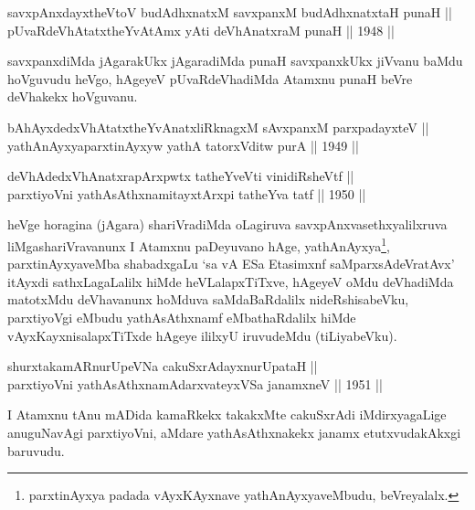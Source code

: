 \begin{shl}
savxpAnxdayxtheVtoV budAdhxnatxM savxpanxM budAdhxnatxtaH punaH || \\
pUvaRdeVhAtatxtheYvA\s \s tAmx yAti deVhAnatxraM punaH ||  1948 ||  
\end{shl}

\begin{artha}
savxpanxdiMda jAgarakUkx jAgaradiMda punaH savxpanxkUkx jiVvanu baMdu
hoVguvudu heVgo, hAgeyeV pUvaRdeVhadiMda Atamxnu punaH beVre deVhakekx
hoVguvanu.
\end{artha}


\begin{shl}
bAhAyxdedxVhAtatxtheYvAnatxliRknagxM sAvxpanxM parxpadayxteV || \\
yathAnAyxyaparxtinAyxyw yathA tatorxVditw purA ||  1949 ||  
\end{shl}

\begin{shl}
deVhAdedxVhAnatxrapArxpwtx tatheYveVti vinidiRsheVtf ||  \\
parxtiyoVni yathAsAthxnamitayxtArxpi tatheYva tatf ||  1950 ||  
\end{shl}

\begin{artha}
heVge horagina (jAgara) shariVradiMda oLagiruva
savxpAnxvasethxyalilxruva liMgashariVravanunx I Atamxnu paDeyuvano
hAge, yathAnAyxya\footnote[1]{parxtinAyxya padada vAyxKAyxnave
yathAnAyxyaveMbudu, beVreyalalx.}, parxtinAyxyaveMba shabadxgaLu
`sa vA ESa Etasimxnf saMparxsAdeVratAvx' itAyxdi sathxLagaLalilx hiMde heVLalapxTiTxve, hAgeyeV oMdu
deVhadiMda matotxMdu deVhavanunx hoMduva saMdaBaRdalilx
nideRshisabeVku, parxtiyoVgi eMbudu yathAsAthxnamf eMbathaRdalilx
hiMde vAyxKayxnisalapxTiTxde hAgeye ililxyU iruvudeMdu (tiLiyabeVku).
\end{artha}


\begin{shl}
shurxtakamARnurUpeVNa cakuSxrAdayxnurUpataH || \\
parxtiyoVni yathAsAthxnamAdarxvateyxVSa janamxneV ||  1951 ||  
\end{shl}

\begin{artha}
I Atamxnu tAnu mADida kamaRkekx takakxMte cakuSxrAdi iMdirxyagaLige
anuguNavAgi parxtiyoVni, aMdare yathAsAthxnakekx janamx
etutxvudakAkxgi baruvudu.
\end{artha}

